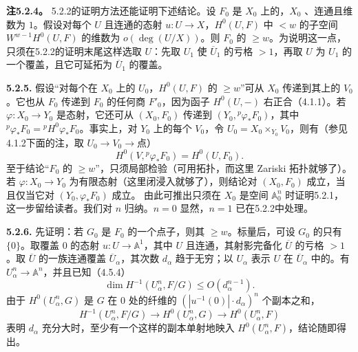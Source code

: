 \par\medskip\noindent\textbf{注5.2.4。} 5.2.2的证明方法还能证明下述结论。设 $F_0$ 是 $X_0$ 上的，$X_0$ 、连通且维数为 $1$。假设对每个 $U$ 且连通的态射 $u:U\to X$，$H^0(U,F)$ 中 $<w$ 的子空间 $W^{w-1}H^0(U,F)$ 的维数为 $o(\deg(U/X))$。则 $F_0$ 的 $\ge w$。为说明这一点，只须在5.2.2的证明末尾这样选取 $U$：先取 $U_1$ 使 $\overline U_1$ 的亏格 $>1$，再取 $U$ 为 $U_1$ 的一个覆盖，且它可延拓为 $\overline U_1$ 的覆盖。
\par\medskip\noindent\textbf{5.2.5.} 假设“对每个在 $X_0$ 上的 $U_0$，$H^0(U,F)$ 的 $\ge w$”可从 $X_0$ 传递到其上的 $V_0$。它也从 $F_0$ 传递到 $F_0$ 的任何商 $F'_0$，因为函子 $H^0(U,-)$ 右正合（4.1.1）。若 $\varphi:X_0\to Y_0$ 是态射，它还可从 $(X_0,F_0)$ 传递到 $(Y_0,{}^p\varphi_*F_0)$，其中 ${}^p\varphi_*F_0={}^pH^0\varphi_*F_0$。事实上，对 $Y_0$ 上的每个 $V_0$，令 $U_0=X_0\times_{Y_0}V_0$，则有（参见4.1.2下面的注，取 $U_0\to V_0\to\text{点}$）
\[
H^0(V,{}^p\varphi_*F_0)=H^0(U,F_0).
\]
至于结论“$F_0$ 的 $\ge w$”，只须局部检验（可用拓扑，而这里 Zariski 拓扑就够了）。若 $\varphi:X_0\to Y_0$ 为有限态射（这里闭浸入就够了），则结论对 $(X_0,F_0)$ 成立，当且仅当它对 $(Y_0,\varphi_*F_0)$ 成立。
由此可推出只须在 $X_0$ 是空间 $\mathbb A_0^n$ 时证明5.2.1，这一步留给读者。我们对 $n$ 归纳。$n=0$ 显然，$n=1$ 已在5.2.2中处理。

\par\medskip\noindent\textbf{5.2.6.} 先证明：若 $G_0$ 是 $F_0$ 的一个点子，则其 $\ge w$。标量后，可设 $G_0$ 的只有 $\{0\}$。取覆盖 $0$ 的态射 $u:U\to\mathbb A^1$，其中 $U$ 且连通，其射影完备化 $\overline U$ 的亏格 $>1$。取 $\overline U$ 的一族连通覆盖 $\overline U_\alpha$，其次数 $d_\alpha$ 趋于无穷；以 $U_\alpha$ 表示 $U$ 在 $\overline U_\alpha$ 中的。有 $U_\alpha^n\to\mathbb A^n$，并且已知（4.5.4）
\[
\dim H^{-1}(U_\alpha^n,F/G)\le O(d_\alpha^{n-1}).
\]
由于 $H^0(U_\alpha^n,G)$ 是 $G$ 在 $0$ 处的纤维的 $(|u^{-1}(0)|\cdot d_\alpha)^n$ 个副本之和，
\[
H^{-1}(U_\alpha^n,F/G)\longrightarrow H^0(U_\alpha^n,G)\longrightarrow H^0(U_\alpha^n,F)
\]
表明 $d_\alpha$ 充分大时，至少有一个这样的副本单射地映入
$H^0(U_\alpha^n,F)$，结论随即得出。

